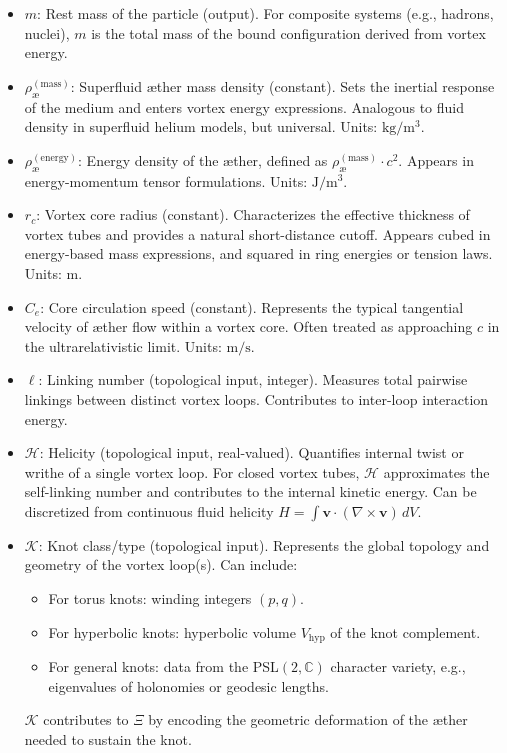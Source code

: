 \begin{itemize}
    \item $m$: Rest mass of the particle (output). For composite systems (e.g., hadrons, nuclei), $m$ is the total mass of the bound configuration derived from vortex energy.

    \item $\rho_{\text{\ae}}^{(\mathrm{mass})}$: Superfluid æther mass density (constant). Sets the inertial response of the medium and enters vortex energy expressions. Analogous to fluid density in superfluid helium models, but universal. Units: $\mathrm{kg/m^3}$.

    \item $\rho_{\text{\ae}}^{(\mathrm{energy})}$: Energy density of the æther, defined as $\rho_{\text{\ae}}^{(\mathrm{mass})} \cdot c^2$. Appears in energy-momentum tensor formulations. Units: $\mathrm{J/m^3}$.

    \item $r_c$: Vortex core radius (constant). Characterizes the effective thickness of vortex tubes and provides a natural short-distance cutoff. Appears cubed in energy-based mass expressions, and squared in ring energies or tension laws. Units: $\mathrm{m}$.

    \item $C_e$: Core circulation speed (constant). Represents the typical tangential velocity of æther flow within a vortex core. Often treated as approaching $c$ in the ultrarelativistic limit. Units: $\mathrm{m/s}$.

    \item $\ell$: Linking number (topological input, integer). Measures total pairwise linkings between distinct vortex loops. Contributes to inter-loop interaction energy.

    \item $\mathcal{H}$: Helicity (topological input, real-valued). Quantifies internal twist or writhe of a single vortex loop. For closed vortex tubes, $\mathcal{H}$ approximates the self-linking number and contributes to the internal kinetic energy. Can be discretized from continuous fluid helicity $H = \int \mathbf{v} \cdot (\nabla \times \mathbf{v}) \, dV$.

    \item $\mathcal{K}$: Knot class/type (topological input). Represents the global topology and geometry of the vortex loop(s). Can include:
    \begin{itemize}
        \item For torus knots: winding integers $(p,q)$.
        \item For hyperbolic knots: hyperbolic volume $V_{\text{hyp}}$ of the knot complement.
        \item For general knots: data from the PSL$(2,\mathbb{C})$ character variety, e.g., eigenvalues of holonomies or geodesic lengths.
    \end{itemize}
    $\mathcal{K}$ contributes to $\Xi$ by encoding the geometric deformation of the æther needed to sustain the knot.
\end{itemize}



